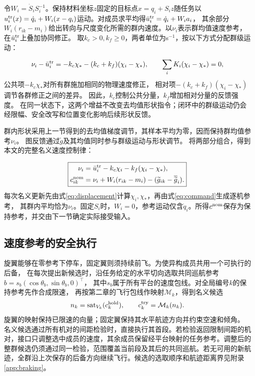 \documentclass[UTF8,a4paper,11pt,fontset=none]{ctexart}
\begin{document}
令$W_i=\dot S_iS_i^{-1}$。保持材料坐标$z$固定的目标点$x=q_i+S_i z$随任务以
$u_i^{\rm tr}(x)=\dot q_i+W_i(x-q_i)$运动。对成员求平均得$\bar u_i^{\rm tr}=\dot q_i+W_i a_i$，
其余部分$W_i(r_{ik}-m_i)$给出转向与尺度变化所需的群内速度。以$\nu_i$表示群均值速度参考，在$\bar u_i^{\rm tr}$上叠加协同修正。
取$k_c>0,k_f\ge0$，两者单位为s$^{-1}$，按以下方式分配群级运动：

\begin{equation}
\nu_i-\bar u_i^{\rm tr}=-k_c\chi_*-(k_c+k_f)(\chi_i-\chi_*),\qquad
\sum_iK_i(\chi_i-\chi_*)=0,
\label{eq:mode-interpretation}
\end{equation}
公共项$-k_c\chi_*$对所有群施加相同的物理速度修正，
相对项$-(k_c+k_f)(\chi_i-\chi_*)$调节各群修正之间的差异。
因此，$k_c$控制公共分量，$k_f$增加相对分量的反馈强度。
在同一状态下，这两个增益不改变去均值形状指令；闭环中的群级运动仍会经限幅、安全改写和位置变化影响后续形状反馈。

群内形状采用上一节得到的去均值梯度调节，其样本平均为零，因而保持群均值参考$\nu_i$。
图反馈通过$\widetilde g$及其均值同时参与群级运动与形状调节。
将两部分组合，得到本文的完整名义速度控制律：

\begin{equation}
\boxed{\begin{aligned}
\nu_i&=\bar u_i^{\rm tr}-k_c\chi_i-k_f(\chi_i-\chi_*),\\
c^{\rm nom}_{ik}&=\nu_i+W_i(r_{ik}-m_i)-(\widetilde g_{ik}-\overline{\widetilde g}_i).
\end{aligned}}
\label{eq:command}
\end{equation}
每次名义更新先由式\eqref{eq:displacement}计算$\chi_i,\chi_*$，再由式\eqref{eq:command}生成逐机参考，
其群内平均恰为$\nu_i$。固定$S_i$时，$W_i=0$，参考运动仅含$\dot q_i$。所得$c^{\rm nom}$保存为保持参考，并交由下一节确定实际接受输入。

\subsection{速度参考的安全执行}\label{sec:safe-execution}
旋翼能够在零参考下停车，固定翼则须持续前飞。为使异构成员共用一个可执行的后备，
在每次提出新候选时，沿任务给定的水平切向选取共同巡航参考$b=s_b(\cos\theta_b,\sin\theta_b,0)^\top$，
其中$s_b$属于所有平台的速度包线。对全局编号$k$的保持参考先作合成限速，
再按第二章的飞行包线作映射$\mathcal M_k$，得到名义候选
\begin{equation}
n_k=\operatorname{sat}_{V_k}(c_k^{\rm hold}),\qquad c_k^{\rm try}=\mathcal M_k(n_k).
\label{eq:candidates}
\end{equation}
旋翼的映射保持已限速的向量；固定翼保持其水平航迹方向并约束空速和倾角。
名义候选通过所有机对的间距检验时，直接执行其首段。若检验返回限制间距的机对，接口只调整选中成员的速度，其余成员保留经平台映射的任务参考。调整后的整群候选仍须通过同一检验，范围覆盖当前段及其后的共同巡航。若无可用的新航迹，全群沿上次保存的后备方向继续飞行。候选的选取顺序和航迹距离界见附录\ref{app:braking}。
\end{document}
